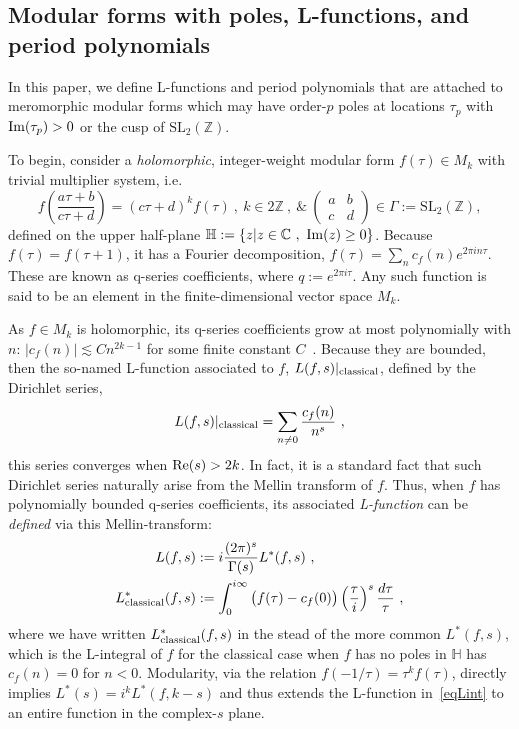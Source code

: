 \documentclass[11pt]{article}
\numberwithin{equation}{section}  %
\newcommand{\HH}{\mathbb{H}}
\newcommand{\ZZ}{\mathbb{Z}}
\newcommand{\CC}{\mathbb{C}}
\newcommand{\SLZ}{\mathrm{SL}_2(\ZZ)}
\begin{document}
\subsection{Modular forms with poles, L-functions, and period polynomials}

In this paper, we define L-functions and period polynomials that are attached 
to meromorphic modular forms which may have order-$p$ poles at locations 
$\tau_p$ with ${\rm Im}(\tau_p) > 0$ or the cusp of $\SLZ$. 

To begin, consider a \emph{holomorphic}, integer-weight modular form 
$f(\tau) \in M_k$ with trivial multiplier system, i.e. 
\begin{equation}
f\left(\frac{a\tau + b}{c\tau + d}\right) = (c\tau + d)^k f(\tau)~,~
k \in 2\ZZ~,~\&~
\left( \begin{smallmatrix} a & b \\ c & d \end{smallmatrix}\right) \in \Gamma := \SLZ,
\label{modularityEq}
\end{equation}
defined on the upper half-plane $\HH := \{ z | z \in \CC~, ~{\rm Im}(z) \geq 0\}$. 
Because $f(\tau) = f(\tau+1)$, it has a Fourier decomposition, 
$f(\tau) = \sum_n c_f(n) e^{2 \pi i n \tau}$. These are known as q-series coefficients, 
where $q := e^{2 \pi i \tau}$. Any such function is said to be an element in the 
finite-dimensional vector space $M_k$. 

As $f \in M_k$ is holomorphic, its q-series coefficients grow at most polynomially 
with $n$: $|c_f(n)| \lesssim C n^{2k-1}$ for some finite constant $C$~\cite{01-Apostol}. 
Because they are bounded, then the so-named L-function associated to $f$, 
$L(f, s)|_{\rm classical}$, defined by the Dirichlet
series,
\begin{align}
L(f, s)|_{\rm classical} = \sum_{n \neq 0} \frac{c_f(n)}{n^s}~,
\end{align}
this series converges when ${\rm Re}(s) > 2k$. In fact, it is a standard fact that such Dirichlet 
series naturally arise from the Mellin transform of $f$. Thus, when $f$ has polynomially 
bounded q-series coefficients, its associated {\em L-function} can be \emph{defined} 
via this Mellin-transform:
\begin{align}
\label{eqLint}
L(f, s) &:= i \frac{(2\pi)^s}{\Gamma(s)} L^*(f, s)~,~\\ 
\nonumber
L_{\rm classical}^*(f, s) &:= \int_0^{i \infty} \big( f(\tau) - c_f(0) \big) \left(\frac{\tau}{i}\right)^s \frac{d\tau}{\tau}~,
\end{align}
where we have written $L_{\rm classical}^*(f,s)$ in the stead of the more common 
$L^*(f,s)$, which is the L-integral of $f$ for the classical case when $f$ has no poles 
in $\HH$ has $c_f(n) = 0$ for $n < 0$. Modularity, via the relation $f(-1/\tau) = \tau^k f(\tau)$, 
directly implies $L^*(s) = i^k L^*(f, k-s)$ and thus extends the L-function in~\eqref{eqLint} to an 
entire function in the complex-$s$ plane. 
\end{document}
